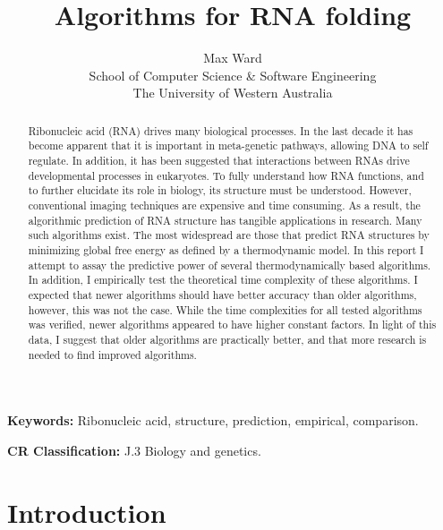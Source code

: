\documentclass[12pt, a4paper]{article}
\title{Algorithms for RNA folding}
\author{Max Ward \\
School of Computer Science \& Software Engineering \\
The University of Western Australia}
\begin{document}
\maketitle

\begin{abstract}
Ribonucleic acid (RNA) drives many biological processes. In the last decade it has become apparent that it is important in meta-genetic pathways, allowing DNA to self regulate. In addition, it has been suggested that interactions between RNAs drive developmental processes in eukaryotes. To fully understand how RNA functions, and to further elucidate its role in biology, its structure must be understood. However, conventional imaging techniques are expensive and time consuming. As a result, the algorithmic prediction of RNA structure has tangible applications in research. Many such algorithms exist. The most widespread are those that predict RNA structures by minimizing global free energy as defined by a thermodynamic model. In this report I attempt to assay the predictive power of several thermodynamically based algorithms. In addition, I empirically test the theoretical time complexity of these algorithms. I expected that newer algorithms should have better accuracy than older algorithms, however, this was not the case. While the time complexities for all tested algorithms was verified, newer algorithms appeared to have higher constant factors. In light of this data, I suggest that older algorithms are practically better, and that more research is needed to find improved algorithms.
\end{abstract}


{\bf Keywords:} Ribonucleic acid, structure, prediction, empirical, comparison.

{\bf CR Classification:} J.3 Biology and genetics.

\clearpage


\section{Introduction}
\end{document}
